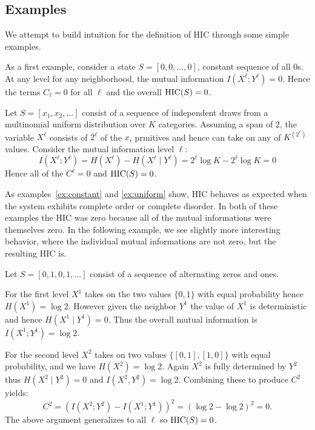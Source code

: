 \subsection{Examples}

We attempt to build intuition for the definition of HIC through some simple
examples.

\begin{example}
  \label{ex:constant}
  As a first example, consider a state $S = [0, 0, \ldots, 0]$,
  constant sequence of all $0$s. At any level for any neighborhood, the mutual
  information $I(X^\ell; Y^\ell) = 0$. Hence the terms $C_\ell = 0$ for all
  $\ell$ and the overall $\textrm{HIC}(S) = 0$.
\end{example}

\begin{example}
  \label{ex:uniform}
  Let $S = [x_1, x_2, \ldots]$ consist of a sequence of independent draws from a
  multinomial uniform distribution over $K$ categories. Assuming a span of $2$,
  the variable $X^\ell$ consists of $2^\ell$ of the $x_i$ prmitives and hence
  can take on any of $K^(2^\ell)$ values. Consider the mutual information level
  $\ell$:
  \begin{equation}
    I(X^\ell; Y^\ell) = H(X^\ell) - H(X^\ell \mid Y^{\ell}) = 2^\ell \log K - 2^\ell \log K = 0
  \end{equation}
  Hence all of the $C^\ell = 0$ and $\textrm{HIC}(S) = 0$.
\end{example}

As examples~\ref{ex:constant} and \ref{ex:uniform} show, HIC behaves as
expected when the system exhibits complete order or complete disorder. In both
of these examples the HIC was zero because all of the mutual informations were
themselves zero. In the following example, we see slightly more interesting
behavior, where the individual mutual informations are not zero, but the
resulting HIC is.

\begin{example}
  \label{ex:repeats}
  Let $S = [0, 1, 0, 1, \ldots]$ consist of a sequence of alternating zeros and
  ones.

  For the first level $X^1$ takes on the two values $\{0, 1\}$ with equal
  probability hence $H(X^1) = \log 2$. However given the neighbor $Y^1$ the
  value of $X^1$ is deterministic and hence $H(X^1 \mid Y^1) = 0$. Thus the
  overall mutual information is $I(X^1; Y^1) = \log 2$.

  For the second level $X^2$ takes on two values $\{[0, 1], [1, 0]\}$ with
  equal probability, and we have $H(X^2) = \log 2$. Again $X^2$ is fully
  determined by $Y^2$ thus $H(X^2 \mid Y^2) = 0$ and $I(X^2, Y^2) = \log 2$.
  Combining these to produce $C^2$ yields:
  \begin{equation}
    C^2 = (I(X^2; Y^2) - I(X^1; Y^1))^2 = (\log 2 - \log 2)^2 = 0.
  \end{equation}
  The above argument generalizes to all $\ell$ so $\textrm{HIC}(S) = 0$.
\end{example}

